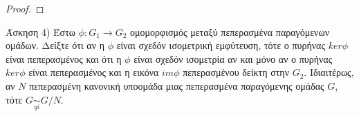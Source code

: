 \documentclass[oneside,a4paper]{article}
\begin{document}
\begin{proof}

\end{proof}




\pagebreak

\noindent Άσκηση 4) Έστω $\phi : G_1 \rightarrow G_2$ ομομορφισμός μεταξύ πεπερασμένα παραγόμενων ομάδων. Δείξτε ότι αν η $\phi$ είναι σχεδόν ισομετρική εμφύτευση, τότε ο πυρήνας $ker\phi$ είναι πεπερασμένος και ότι η $\phi$ είναι σχεδόν ισομετρία αν και μόνο αν ο πυρήνας $ker\phi$ είναι πεπερασμένος και η εικόνα $im\phi$ πεπερασμένου δείκτη στην $G_2$. Ιδιαιτέρως, αν $N$ πεπερασμένη κανονική υποομάδα μιας πεπερασμένα παραγόμενης ομάδας $G$, τότε $G\underset{qi}{\sim} G/N$.
\end{document}
